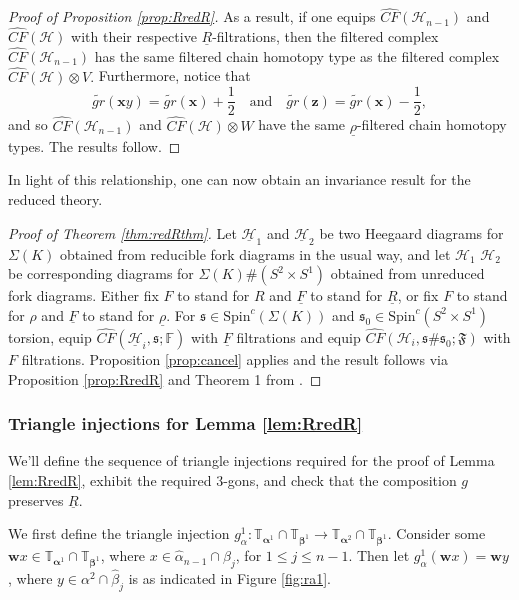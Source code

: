 \documentclass[11pt]{article}
\theoremstyle{plain} \newtheorem{thm}{Theorem}[subsection]
\theoremstyle{plain} \newtheorem{cor}[thm]{Corollary}
\theoremstyle{plain} \newtheorem{prop}[thm]{Proposition}
\theoremstyle{plain} \newtheorem{conj}[thm]{Conjecture}
\theoremstyle{plain} \newtheorem{lem}[thm]{Lemma}
\theoremstyle{definition} \newtheorem{df}[thm]{Definition}
\theoremstyle{remark} \newtheorem{rmk}[thm]{Remark}
\theoremstyle{remark} \newtheorem{obs}[thm]{Observation}
\newcommand{\DBCs}[1]{\Sigma(#1)\#(S^{2}\times S^{1})}
\newcommand{\SxS}{S^{2}\times S^{1}}
\newcommand{\DBC}[1]{\Sigma(#1)}
\newcommand{\h}{\mathcal{H}}
\newcommand{\tld}[1]{\widetilde{#1}}
\newcommand{\red}[1]{\underline{#1}}
\newcommand{\ah}{\widehat{\alpha}}
\newcommand{\bh}{\widehat{\beta}}
\newcommand{\ba}{\boldsymbol{\alpha}}
\newcommand{\bb}{\boldsymbol{\beta}}
\newcommand{\bx}{\mathbf{x}}
\newcommand{\bw}{\mathbf{w}}
\newcommand{\bz}{\mathbf{z}}
\newcommand{\tor}[1]{\mathbb{T}_{#1}}
\numberwithin{equation}{section}
\begin{document}
\begin{proof}[Proof of Proposition \ref{prop:RredR}]
As a result, if one equips $\widehat{CF}(\h_{n-1})$ and $\widehat{CF}(\h)$ with their respective $\red{R}$-filtrations, then the filtered complex $\widehat{CF}(\h_{n-1})$ has the same filtered chain homotopy type as the filtered complex $\widehat{CF}(\h) \otimes V.$
Furthermore, notice that
$$ \tld{gr}(\bx y) = \tld{gr}(\bx) + \frac{1}{2} \quad \text{and} \quad \tld{gr}(\bz) = \tld{gr}(\bx) - \frac{1}{2},$$
and so $\widehat{CF}(\h_{n-1})$ and $\widehat{CF}(\h) \otimes W$ have the same $\red{\rho}$-filtered chain homotopy types.  The results follow.
\end{proof}

In light of this relationship, one can now obtain an invariance result for the reduced theory.

\begin{proof}[Proof of Theorem \ref{thm:redRthm}]
Let $\red{\h}_{1}$ and $\red{\h}_{2}$ be two Heegaard diagrams for $\DBC{K}$ obtained from reducible fork diagrams in the usual way, and let $\h_{1}$ $\h_{2}$ be corresponding diagrams for $\DBCs{K}$ obtained from unreduced fork diagrams.  Either fix $F$ to stand for $R$ and $\red{F}$ to stand for $\red{R}$, or fix $F$ to stand for $\rho$ and $\red{F}$ to stand for $\red{\rho}$.  For $\mathfrak{s} \in \text{Spin}^{c}(\DBC{K})$ and $\mathfrak{s}_{0} \in \text{Spin}^{c}(\SxS)$ torsion, equip $\widehat{CF}(\red{\h}_{i},\mathfrak{s} ; \mathbb{F})$ with $\red{F}$ filtrations and equip $\widehat{CF}(\h_{i},\mathfrak{s} \# \mathfrak{s}_{0}; \mathfrak{F})$ with $F$ filtrations.   Proposition \ref{prop:cancel} applies and the result follows via Proposition \ref{prop:RredR} and Theorem 1 from \cite{et:R}.
\end{proof}

\subsubsection{Triangle injections for Lemma \ref{lem:RredR}}\label{sec:redtri}

We'll define the sequence of triangle injections required for the proof of Lemma \ref{lem:RredR}, exhibit the required 3-gons, and check that the composition $g$ preserves $\red{R}$.

We first define the triangle injection $g_{\alpha}^1:\tor{\ba^1} \cap \tor{\bb^1} \rightarrow \tor{\ba^2} \cap \tor{\bb^1}$.  Consider some $\bw x \in \tor{\ba^1} \cap \tor{\bb^1}$, where $x \in \ah_{n-1} \cap \bh_j$, for $1 \leq j \leq n-1$.  Then let $g_{\alpha}^1(\bw x) = \bw y$, where $y \in \alpha^{2} \cap \bh_j$ is as indicated in Figure \ref{fig:ra1}.
\end{document}

